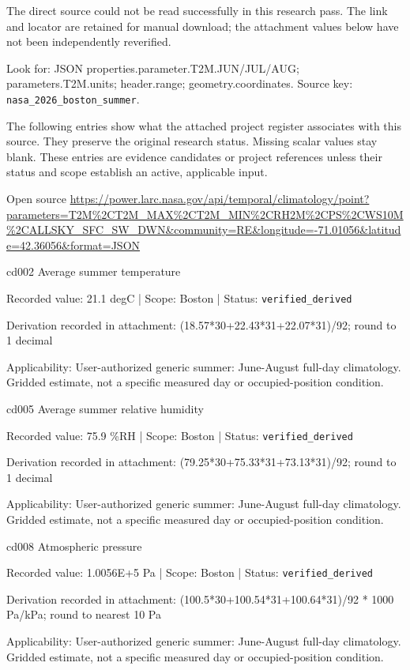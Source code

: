 The direct source could not be read successfully in this research pass. The link and locator are retained for manual download; the attachment values below have not been independently reverified.

Look for: JSON properties.parameter.T2M.JUN/JUL/AUG; parameters.T2M.units; header.range; geometry.coordinates. Source key: \nolinkurl{nasa_2026_boston_summer}.

The following entries show what the attached project register associates with this source. They preserve the original research status. Missing scalar values stay blank. These entries are evidence candidates or project references unless their status and scope establish an active, applicable input.

Open source  \url{https://power.larc.nasa.gov/api/temporal/climatology/point?parameters=T2M%2CT2M_MAX%2CT2M_MIN%2CRH2M%2CPS%2CWS10M%2CALLSKY_SFC_SW_DWN&community=RE&longitude=-71.01056&latitude=42.36056&format=JSON}

cd002  Average summer temperature

Recorded value: 21.1 degC | Scope: Boston | Status: \nolinkurl{verified_derived}

Derivation recorded in attachment: (18.57*30+22.43*31+22.07*31)/92; round to 1 decimal

Applicability: User-authorized generic summer: June-August full-day climatology. Gridded estimate, not a specific measured day or occupied-position condition.

cd005  Average summer relative humidity

Recorded value: 75.9 \%RH | Scope: Boston | Status: \nolinkurl{verified_derived}

Derivation recorded in attachment: (79.25*30+75.33*31+73.13*31)/92; round to 1 decimal

Applicability: User-authorized generic summer: June-August full-day climatology. Gridded estimate, not a specific measured day or occupied-position condition.

cd008  Atmospheric pressure

Recorded value: 1.0056E+5 Pa | Scope: Boston | Status: \nolinkurl{verified_derived}

Derivation recorded in attachment: (100.5*30+100.54*31+100.64*31)/92 * 1000 Pa/kPa; round to nearest 10 Pa

Applicability: User-authorized generic summer: June-August full-day climatology. Gridded estimate, not a specific measured day or occupied-position condition.

